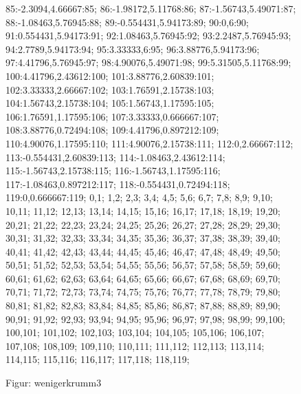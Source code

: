\documentclass[a4paper,10pt,ngerman]{scrartcl}
\begin{document}
\begin{figure}
{    85:-2.3094,4.66667:85;
    86:-1.98172,5.11768:86;
    87:-1.56743,5.49071:87;
    88:-1.08463,5.76945:88;
    89:-0.554431,5.94173:89;
    90:0,6:90;
    91:0.554431,5.94173:91;
    92:1.08463,5.76945:92;
    93:2.2487,5.76945:93;
    94:2.7789,5.94173:94;
    95:3.33333,6:95;
    96:3.88776,5.94173:96;
    97:4.41796,5.76945:97;
    98:4.90076,5.49071:98;
    99:5.31505,5.11768:99;
    100:4.41796,2.43612:100;
    101:3.88776,2.60839:101;
    102:3.33333,2.66667:102;
    103:1.76591,2.15738:103;
    104:1.56743,2.15738:104;
    105:1.56743,1.17595:105;
    106:1.76591,1.17595:106;
    107:3.33333,0.666667:107;
    108:3.88776,0.72494:108;
    109:4.41796,0.897212:109;
    110:4.90076,1.17595:110;
    111:4.90076,2.15738:111;
    112:0,2.66667:112;
    113:-0.554431,2.60839:113;
    114:-1.08463,2.43612:114;
    115:-1.56743,2.15738:115;
    116:-1.56743,1.17595:116;
    117:-1.08463,0.897212:117;
    118:-0.554431,0.72494:118;
    119:0,0.666667:119;
}{
0,1;
1,2;
2,3;
3,4;
4,5;
5,6;
6,7;
7,8;
8,9;
9,10;
10,11;
11,12;
12,13;
13,14;
14,15;
15,16;
16,17;
17,18;
18,19;
19,20;
20,21;
21,22;
22,23;
23,24;
24,25;
25,26;
26,27;
27,28;
28,29;
29,30;
30,31;
31,32;
32,33;
33,34;
34,35;
35,36;
36,37;
37,38;
38,39;
39,40;
40,41;
41,42;
42,43;
43,44;
44,45;
45,46;
46,47;
47,48;
48,49;
49,50;
50,51;
51,52;
52,53;
53,54;
54,55;
55,56;
56,57;
57,58;
58,59;
59,60;
60,61;
61,62;
62,63;
63,64;
64,65;
65,66;
66,67;
67,68;
68,69;
69,70;
70,71;
71,72;
72,73;
73,74;
74,75;
75,76;
76,77;
77,78;
78,79;
79,80;
80,81;
81,82;
82,83;
83,84;
84,85;
85,86;
86,87;
87,88;
88,89;
89,90;
90,91;
91,92;
92,93;
93,94;
94,95;
95,96;
96,97;
97,98;
98,99;
99,100;
100,101;
101,102;
102,103;
103,104;
104,105;
105,106;
106,107;
107,108;
108,109;
109,110;
110,111;
111,112;
112,113;
113,114;
114,115;
115,116;
116,117;
117,118;
118,119;
}
\caption{Figur: wenigerkrumm3}
        \label{fig:wenigerkrumm3}
    \end{figure}
\newpage
\end{document}
